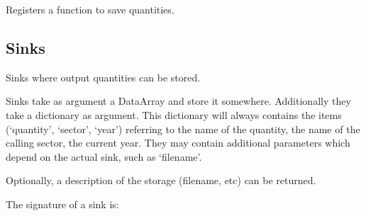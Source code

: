 \documentclass[letterpaper,10pt,english]{sphinxmanual}
\begin{document}
\begin{fulllineitems}
\label{\detokenize{api:muse.outputs.register_output_sink}}
Registers a function to save quantities.

\end{fulllineitems}



\subsection{Sinks}
\label{\detokenize{api:module-muse.outputs.sinks}}\label{\detokenize{api:sinks}}
Sinks where output quantities can be stored.

Sinks take as argument a DataArray and store it somewhere. Additionally they
take a dictionary as argument. This dictionary will always contains the items
(‘quantity’, ‘sector’, ‘year’) referring to the name of the quantity, the name
of the calling sector, the current year. They may contain additional parameters
which depend on the actual sink, such as ‘filename’.

Optionally, a description of the storage (filename, etc) can be returned.

The signature of a sink is:

\begin{sphinxVerbatim}[commandchars=\\\{\}]
      \PYG{p}{[}\PYG{p}{]}
\end{sphinxVerbatim}
\end{document}
